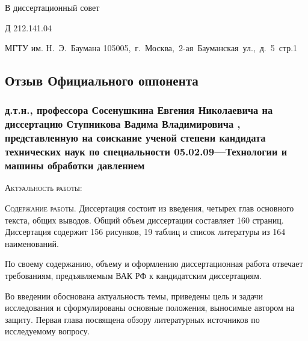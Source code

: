 


\hfill\parbox{6cm}{
\centerline{В диссертационный совет}
\centerline{Д 212.141.04}
МГТУ им. Н.~Э.~Баумана
105005,~г.~Москва,~2-ая~Бауманская~ул.,~д.~5~стр.1
}
\vspace{1cm}

\begin{center}
    \section*{Отзыв Официального оппонента}
\end{center}


\subsubsection*{д.т.н., профессора Сосенушкина Евгения Николаевича
на диссертацию Ступникова Вадима Владимировича {\thesisTitle}, представленную на соискание ученой степени кандидата технических наук по специальности 05.02.09---Технологии и машины обработки давлением}

\textsc{Актуальность работы}: {\actualityTEXT}

\textsc{Содержание работы}. 
Диссертация состоит из введения, четырех глав основного текста, общих выводов. Общий объем диссертации составляет 160 страниц. Диссертация содержит 156 рисунков, 19 таблиц и список литературы из 164 наименований.

По своему содержанию, объему и оформлению диссертационная работа отвечает требованиям, предъявляемым ВАК РФ к кандидатским диссертациям.

Во введении обоснована актуальность темы, приведены цель и задачи исследования и сформулированы основные положения, выносимые автором на защиту.
Первая глава посвящена обзору литературных источников по исследуемому вопросу. 

